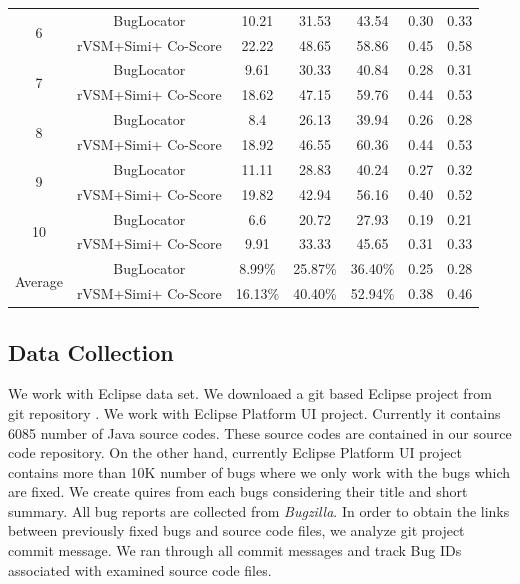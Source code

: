 \documentclass[conference]{IEEEtran}
\begin{document}
\begin{table}[htbp]
{\begin{tabular}{c|c|c|c|c|c|c}
			\multirow{2}{*}{6}  &BugLocator     &  10.21& 31.53&43.54& 0.30 & 0.33 \\  \cline{2-7}
			& rVSM+Simi+ Co-Score
			&22.22 &
			48.65 &
			58.86 & 0.45 &
			0.58     \\  \hline
			\multirow{2}{*}{7}  &BugLocator     &  9.61& 30.33&40.84& 0.28 & 0.31 \\ \cline{2-7}
			& rVSM+Simi+ Co-Score
			&18.62 &
			47.15 &
			59.76 & 0.44 &
			0.53     \\  \hline
			\multirow{2}{*}{8}  &BugLocator     &  8.4& 26.13&39.94& 0.26 & 0.28 \\ \cline{2-7}
			& rVSM+Simi+ Co-Score
			&18.92 &
			46.55 &
			60.36 & 0.44 &
			0.53    \\  \hline
			\multirow{2}{*}{9}  &BugLocator     &  11.11& 28.83&40.24& 0.27 & 0.32 \\  \cline{2-7}
			& rVSM+Simi+ Co-Score
			&19.82 &
			42.94 &
			56.16 & 0.40 &
			0.52    \\  \hline
			\multirow{2}{*}{10}  &BugLocator     &  6.6& 20.72&27.93& 0.19 & 0.21 \\  \cline{2-7}
			& rVSM+Simi+ Co-Score
			&9.91 &
			33.33 &
			45.65 & 0.31 &
			0.33    \\  \hline \hline
			\multirow{2}{*}{Average}       &BugLocator     &  8.99\%& 25.87\%&36.40\%& 0.25 & 0.28  \\ \cline{2-7}
			& rVSM+Simi+ Co-Score                                                                                                                         & 16.13\%                                                 & 40.40\%                                                 & 52.94\%                                                  &   0.38  &  0.46    \\ 
			\hline
\end{tabular}}
\centering
\end{table}

\subsection{Data Collection}
We work with Eclipse data set. We downloaed a git based Eclipse project from git repository \cite{eclipseGit}. We work with Eclipse Platform UI project. Currently it contains 6085 number of Java source codes. These source codes are contained in our source code repository. On the other hand, currently Eclipse Platform UI project contains more than 10K number of bugs where we only work with the bugs which are fixed. We create quires from each bugs considering their title and short summary.
All bug reports are collected from \textit{Bugzilla}. In order to obtain the links between previously fixed bugs and source code files, we analyze git project commit message. We ran through all commit messages and track Bug IDs associated with examined source code files.
\end{document}
